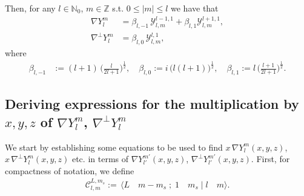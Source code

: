 \documentclass[11pt, oneside]{article}   	%
\newcommand{\half}{\frac{1}{2}}
\newcommand{\Z}{\mathbb{Z}}
\newcommand{\No}{\mathbb{N}_0}
\newcommand{\Ylm}{Y^m_l}
\newcommand{\gradY}{\nabla Y}
\newcommand{\gradYlm}{\nabla Y^m_l}
\newcommand{\gradpY}{\nabla^\perp Y}
\newcommand{\gradpYlm}{\nabla^\perp Y^m_l}
\newcommand{\curlyy}{\bm{\mathcal{Y}}}
\newcommand{\blone}{\beta_{l, 1}}
\newcommand{\blzero}{\beta_{l, 0}}
\newcommand{\blmone}{\beta_{l, -1}}
\newcommand{\cgcoeff}{\mathcal{C}}
\begin{document}
Then, for any \(l \in \No\), \(m \in \Z\) s.t. \(0 \le |m| \le l\) we have that
\begin{align}
\nabla \Ylm &= \blmone \, \curlyy^{l-1,1}_{l,m} + \blone \curlyy^{l+1,1}_{l,m}, \\
\nabla^\perp \Ylm &= \blzero \, \curlyy^{l,1}_{l,m},
\end{align}
where
\begin{align}
\blmone &:= (l+1) \, \Big(\frac{l}{2l+1}\Big)^\half, \quad
\blzero := i \, \big(l(l+1)\big)^\half, \quad
\blone := l \, \Big(\frac{l+1}{2l+1}\Big)^\half.
\end{align}


\subsection{Deriving expressions for the multiplication by \(x, y, z\) of \(\nabla \Ylm\), \(\nabla^\perp \Ylm\) }

We start by establishing some equations to be used to find \(x \,\gradYlm (x,y,z)\), \(x \,\gradpYlm (x,y,z)\) etc. in terms of \(\gradY^{m'}_{l'} (x,y,z)\), \(\gradpY^{m'}_{l'} (x,y,z)\). First, for compactness of notation, we define
\begin{align}
\cgcoeff^{L, m_s}_{l, m} := \, \langle L \quad m-m_s \; ; \; 1 \quad m_s \; | \; l \quad m \rangle.
\end{align}
\end{document}
